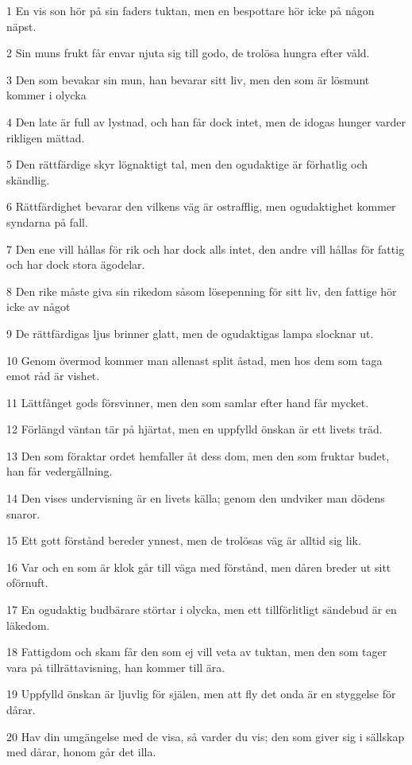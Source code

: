 \par 1 En vis son hör på sin faders tuktan, men en bespottare hör icke på någon näpst.
\par 2 Sin muns frukt får envar njuta sig till godo, de trolösa hungra efter våld.
\par 3 Den som bevakar sin mun, han bevarar sitt liv, men den som är lösmunt kommer i olycka
\par 4 Den late är full av lystnad, och han får dock intet, men de idogas hunger varder rikligen mättad.
\par 5 Den rättfärdige skyr lögnaktigt tal, men den ogudaktige är förhatlig och skändlig.
\par 6 Rättfärdighet bevarar den vilkens väg är ostrafflig, men ogudaktighet kommer syndarna på fall.
\par 7 Den ene vill hållas för rik och har dock alls intet, den andre vill hållas för fattig och har dock stora ägodelar.
\par 8 Den rike måste giva sin rikedom såsom lösepenning för sitt liv, den fattige hör icke av något
\par 9 De rättfärdigas ljus brinner glatt, men de ogudaktigas lampa slocknar ut.
\par 10 Genom övermod kommer man allenast split åstad, men hos dem som taga emot råd är vishet.
\par 11 Lättfånget gods försvinner, men den som samlar efter hand får mycket.
\par 12 Förlängd väntan tär på hjärtat, men en uppfylld önskan är ett livets träd.
\par 13 Den som föraktar ordet hemfaller åt dess dom, men den som fruktar budet, han får vedergällning.
\par 14 Den vises undervisning är en livets källa; genom den undviker man dödens snaror.
\par 15 Ett gott förstånd bereder ynnest, men de trolösas väg är alltid sig lik.
\par 16 Var och en som är klok går till väga med förstånd, men dåren breder ut sitt oförnuft.
\par 17 En ogudaktig budbärare störtar i olycka, men ett tillförlitligt sändebud är en läkedom.
\par 18 Fattigdom och skam får den som ej vill veta av tuktan, men den som tager vara på tillrättavisning, han kommer till ära.
\par 19 Uppfylld önskan är ljuvlig för själen, men att fly det onda är en styggelse för dårar.
\par 20 Hav din umgängelse med de visa, så varder du vis; den som giver sig i sällskap med dårar, honom går det illa.
